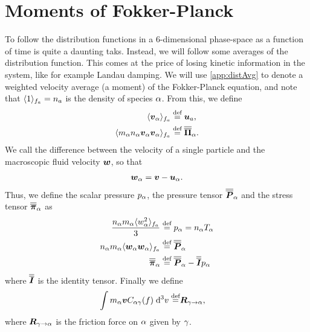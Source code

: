\section{Moments of Fokker-Planck}
To follow the distribution functions in a 6-dimensional phase-space as a function of time is quite a daunting taks.
Instead, we will follow some averages of the distribution function.
This comes at the price of losing kinetic information in the system, like for example Landau damping.
We will use \cref{app:distAvg} to denote a weighted velocity average (a moment) of the Fokker-Planck equation, and note that $\langle{1}\rangle_{f_a}=n_a$ is the density of species $\alpha$.
From this, we define
%
\begin{align*}
    \langle{\boldsymbol{v}_\alpha}\rangle_{f_a}        \overset{\text{def}}{=}& \; \boldsymbol{u}_a,      \\
    \langle{m_\alpha n_\alpha\boldsymbol{v}_\alpha\boldsymbol{v}_\alpha}\rangle_{f_a} \overset{\text{def}}{=}&\; \boldsymbol{\overline{\overline{\Pi}}}_\alpha.
\end{align*}
%
We call the difference between the velocity of a single particle and the macroscopic fluid velocity $\boldsymbol{w}$, so that
%
\begin{align*}
    \boldsymbol{w}_\alpha = \boldsymbol{v} - \boldsymbol{u}_\alpha.
\end{align*}
%
Thus, we define the scalar pressure $p_\alpha$, the pressure tensor $\boldsymbol{\overline{\overline{P}}}_\alpha$ and the stress tensor $\boldsymbol{\overline{\overline{\pi}}}_\alpha$ as
%
\begin{align*}
    \frac{n_\alpha m_\alpha\langle{w_\alpha^2}\rangle_{f_a}}{3} \overset{\text{def}}{=}& \; p_\alpha = n_\alpha T_\alpha\\
    n_\alpha m_\alpha\langle{\boldsymbol{w}_{\alpha}\boldsymbol{w}_{\alpha}}\rangle_{f_a} \overset{\text{def}}{=}& \; \boldsymbol{\overline{\overline{P}}}_\alpha\\
    \boldsymbol{\overline{\overline{\pi}}}_\alpha \overset{\text{def}}{=}& \; \boldsymbol{\overline{\overline{P}}}_\alpha - \boldsymbol{\overline{\overline{I}}}p_\alpha\\
\end{align*}
%
where $\boldsymbol{\overline{\overline{I}}}$ is the identity tensor.
Finally we define
%
\begin{align*}
    \int {m_\alpha\boldsymbol{v} C_{\alpha\gamma}(f)} \; \text{d} {^3v} \overset{\text{def}}{=}& \boldsymbol{R}_{\gamma\to\alpha},
\end{align*}
%
where $\boldsymbol{R}_{\gamma\to\alpha}$ is the friction force on $\alpha$ given by $\gamma$.

